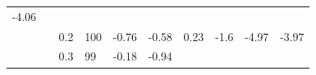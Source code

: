 \documentclass[12pt,oneside,a4paper]{reedthesis}
\begin{document}
\begin{longtable}[]{@{}llllllllll@{}}
\begin{minipage}[t]{0.09\columnwidth}
-4.06\strut
\end{minipage}\tabularnewline
\begin{minipage}[t]{0.11\columnwidth}\raggedright
\strut
\end{minipage} & \begin{minipage}[t]{0.05\columnwidth}\raggedright
\strut
\end{minipage} & \begin{minipage}[t]{0.05\columnwidth}\raggedright
0.2\strut
\end{minipage} & \begin{minipage}[t]{0.05\columnwidth}\raggedright
100\strut
\end{minipage} & \begin{minipage}[t]{0.07\columnwidth}\raggedright
-0.76\strut
\end{minipage} & \begin{minipage}[t]{0.07\columnwidth}\raggedright
-0.58\strut
\end{minipage} & \begin{minipage}[t]{0.07\columnwidth}\raggedright
0.23\strut
\end{minipage} & \begin{minipage}[t]{0.07\columnwidth}\raggedright
-1.6\strut
\end{minipage} & \begin{minipage}[t]{0.09\columnwidth}\raggedright
-4.97\strut
\end{minipage} & \begin{minipage}[t]{0.09\columnwidth}\raggedright
-3.97\strut
\end{minipage}\tabularnewline
\begin{minipage}[t]{0.11\columnwidth}\raggedright
\strut
\end{minipage} & \begin{minipage}[t]{0.05\columnwidth}\raggedright
\strut
\end{minipage} & \begin{minipage}[t]{0.05\columnwidth}\raggedright
0.3\strut
\end{minipage} & \begin{minipage}[t]{0.05\columnwidth}\raggedright
99\strut
\end{minipage} & \begin{minipage}[t]{0.07\columnwidth}\raggedright
-0.18\strut
\end{minipage} & \begin{minipage}[t]{0.07\columnwidth}\raggedright
-0.94\strut
\end{minipage} & \begin{minipage}[t]{0.07\columnwidth}\raggedright

\end{minipage}
\end{longtable}
\end{document}
